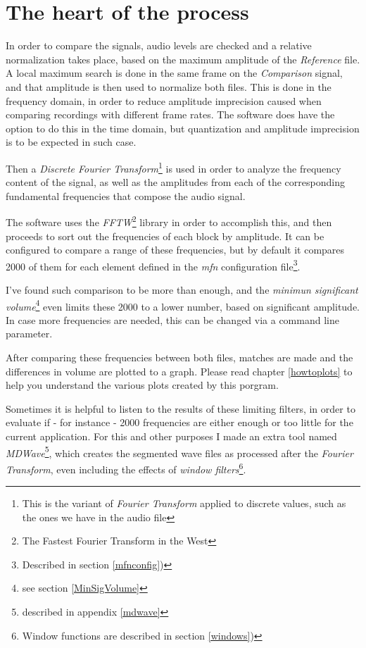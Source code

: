 \documentclass[10pt,a4paper]{report}
\begin{document}
\section{The heart of the process}

In order to compare the signals, audio levels are checked and a relative normalization takes place, based on the maximum amplitude of the \textit{Reference} file. A local maximum search is done in the same frame on the \textit{Comparison} signal, and that amplitude is then used to normalize both files. This is done in the frequency domain, in order to reduce amplitude imprecision caused when comparing recordings with different frame rates. The software does have the option to do this in the time domain, but quantization and amplitude imprecision is to be expected in such case.

Then a \textit{Discrete Fourier Transform}\footnote{This is the variant of \textit{Fourier Transform} applied to discrete values, such as the ones we have in the audio file\cite{FourierTransformApps}} is used in order to analyze the frequency content of the signal, as well as the amplitudes from each of the corresponding fundamental frequencies that compose the audio signal.

The software uses the \textit{FFTW}\footnote{The Fastest Fourier Transform in the West\cite{fftw}} library in order to accomplish this, and then proceeds to sort out the frequencies of each block by amplitude. It can be configured to compare a range of these frequencies, but by default it compares 2000 of them for each element defined in the \textit{mfn} configuration file\footnote{Described in section \ref{mfnconfig})}.

I've found such comparison to be more than enough, and the \textit{minimun significant volume}\footnote{  see section \ref{MinSigVolume}} even limits these 2000 to a lower number, based on significant amplitude. In case more frequencies are needed, this can be changed via a command line parameter.

After comparing these frequencies between both files, matches are made and the differences in volume are plotted to a graph. Please read chapter \ref{howtoplots} to help you understand the various plots created by this porgram.

Sometimes it is helpful to listen to the results of these limiting filters, in order to evaluate if - for instance - 2000 frequencies are either enough or too little for the current application. For this and other purposes I made an extra tool named \textit{MDWave}\footnote{described in appendix \ref{mdwave}}, which creates the segmented wave files as processed after the \textit{Fourier Transform}, even including the effects of \textit{window filters}\footnote{Window functions are described in section \ref{windows})}.
\end{document}

